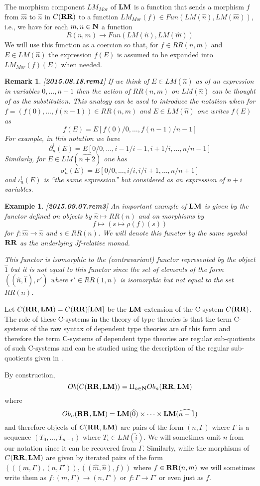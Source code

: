\documentclass[11pt]{article}
\newtheorem{example}[proposition]{Example}
\newtheorem{remark}[proposition]{Remark}
\newcommand{\llabel}[1]{\label{#1}[{\bf #1}]}
\newcommand{\sr}{\rightarrow}
\newcommand{\nn}{{\bf N\rm}}
\newcommand{\nat}{\nn}
\newcommand{\wh}{\widehat}
\newcommand{\mbind}{\rho}
\newcommand{\RR}{{\bf RR}}
\newcommand{\LM}{{\bf LM}}
\begin{document}
The morphism component $LM_{Mor}$ of $\LM$ is a function that sends a morphism $f$ from $\wh{m}$ to $\wh{n}$ in $C(\RR)$ to a function $LM_{Mor}(f)\in Fun(LM(\wh{n}),LM(\wh{m}))$, i.e., we have for each $m,n\in\nat$ a function
%
$$R(n,m)\sr Fun(LM(\wh{n}),LM(\wh{m}))$$
%
We will use this function as a coercion so that, for $f\in RR(n,m)$ and $E\in LM(\wh{n})$ the expression $f(E)$ is assumed to be expanded into $LM_{Mor}(f)(E)$ when needed. 
%
\begin{remark}\rm
\llabel{2015.08.18.rem1}
If we think of $E\in LM(\wh{n})$ as of an expression in variables $0,\dots,n-1$ then the action of $RR(n,m)$ on $LM(\wh{n})$ can be thought of as the substitution. This analogy can be used to introduce the notation when for $f=(f(0),\dots,f(n-1))\in RR(n,m)$ and $E\in LM(\wh{n})$ one writes $f(E)$ as 
%
$$f(E)=E[f(0)/0,\dots,f(n-1)/n-1]$$
%
For example, in this notation we have 
%
$$\partial^i_n(E)=E[0/0,\dots,i-1/i-1,i+1/i,\dots,n/n-1]$$
%
Similarly, for $E\in LM(\wh{n+2})$ one has
%
$$\sigma^i_n(E)=E[0/0,\dots,i/i,i/i+1,\dots,n/n+1]$$
%
and $\iota_n^i(E)$ is ``the same expression'' but considered as an expression of $n+i$ variables.
\end{remark}
%
\begin{example}\rm
\llabel{2015.09.07.rem3}
An important example of $\LM$ is given by the functor defined on objects by $\wh{n}\mapsto RR(n)$ and on morphisms by 
%
$$f\mapsto (s\mapsto\mbind(f)(s))$$
%
for $f:\wh{m}\sr \wh{n}$ and $s\in RR(n)$. We will denote this functor by the same symbol $\RR$ as the underlying Jf-relative monad. 

This functor is isomorphic to the (contravariant) functor represented by the object $\wh{1}$ but it is not equal to this functor since the set of elements of the form  $((\wh{n},\wh{1}),r')$ where $r'\in RR(1,n)$ is isomorphic but not equal to the set $RR(n)$.
\end{example}

Let $C(\RR,\LM)=C(\RR)[\LM]$ be the $\LM$-extension of the C-system $C(\RR)$. The role of these C-systems in the theory of type theories is that the term C-systems of the raw syntax of dependent type theories are of this form and therefore the term C-systems of dependent type theories are regular sub-quotients of such C-systems and can be studied using the description of the regular sub-quotients given in \cite{Csubsystems}.  

By construction,
%
$$Ob(C(\RR,\LM))=\amalg_{n\in\nat}Ob_n(\RR,\LM)$$
%
where 
%
$$Ob_n(\RR,\LM)=\LM(\wh{0})\times\dots\times\LM(\wh{n-1})$$
%
and therefore objects of $C(\RR,\LM)$ are pairs of the form $(n,\Gamma)$ where $\Gamma$ is a sequence $(T_0,\dots,T_{n-1})$ where $T_i\in LM(\wh{i})$. We will sometimes omit $n$ from our notation since it can be recovered from $\Gamma$. Similarly, while the morphisms of $C(\RR,\LM)$ are given by iterated pairs of the form $(((m,\Gamma),(n,\Gamma')),((\wh{m},\wh{n}),f))$ where $f\in \RR(n,m)$ we will sometimes write them as $f:(m,\Gamma)\sr (n,\Gamma')$ or $f:\Gamma\sr \Gamma'$ or even just as $f$. 
\end{document}
